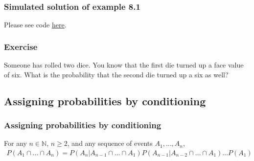 \begin{frame}[fragile]
    \frametitle{Simulated solution of example 8.1}

    Please see code \href{https://joacorapela.github.io/gcnuBridging2023/auto_examples/foundations/plot_example8_1.html#sphx-glr-auto-examples-foundations-plot-example8-1-py}{here}.

\end{frame}

\begin{frame}
    \frametitle{Exercise}

    Someone has rolled two dice. You know that the first die turned up a
face value of six. What is the probability that the second die turned up a six
as  well?

\end{frame}

\subsection{Assigning probabilities by conditioning}

\begin{frame}
    \frametitle{Assigning probabilities by conditioning}

    \scriptsize
    \begin{probRule}
        \label{rule:assignProByCond}
        For any $n\in\mathbb{N}$, $n\ge 2$, and any sequence of events $A_1,\ldots,A_n$,
            \begin{align*}
                P(A_1\cap\ldots\cap A_n) = P(A_n|A_{n-1}\cap\ldots\cap A_1)
                P(A_{n-1}|A_{n-2}\cap\ldots\cap A_1)\ldots P(A_1)
            \end{align*}
    \end{probRule}

\end{frame}

